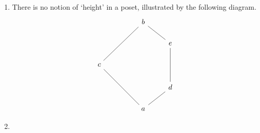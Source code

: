 \begin{example}
\begin{enumerate}
        \[\begin{tikzcd}
            \vdots \\
            3 \\
            2 \\
            1 \\
            0
            \arrow[no head, from=5-1, to=4-1]
            \arrow[no head, from=4-1, to=3-1]
            \arrow[no head, from=3-1, to=2-1]
            \arrow[no head, from=2-1, to=1-1]
        \end{tikzcd}\]
        The rationals cannot, since no element covers another.
        \item There is no notion of `height' in a poset, illustrated by the following diagram.
        \[\begin{tikzcd}
            && b \\
            &&& e \\
            c \\
            &&& d \\
            && a
            \arrow[no head, from=5-3, to=4-4]
            \arrow[no head, from=4-4, to=2-4]
            \arrow[no head, from=2-4, to=1-3]
            \arrow[no head, from=5-3, to=3-1]
            \arrow[no head, from=3-1, to=1-3]
        \end{tikzcd}\]
        \item

\end{enumerate}
\end{example}
